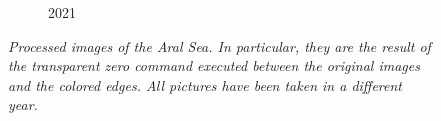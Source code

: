 \documentclass[12pt,a4paper]{article}
\begin{document}
\begin{figure}[H]
\begin{subfigure}[b]{0.19\textwidth}
        \caption{2021}
    \end{subfigure}
    \caption{\emph{Processed images of the Aral Sea.
            In particular, they are the result of the transparent zero command executed between the original images and the colored edges.
            All pictures have been taken in a different year.}}
    \label{fig:appendixedges}
\end{figure}

\printbibliography
\end{document}
